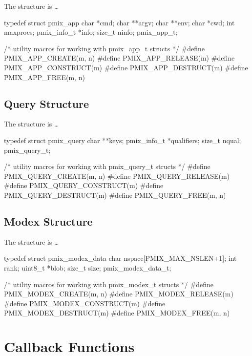 The  structure is \ldots

\cspecificstart
\begin{codepar}
typedef struct pmix_app {
    char *cmd;
    char **argv;
    char **env;
    char *cwd;
    int maxprocs;
    pmix_info_t *info;
    size_t ninfo;
} pmix_app_t;

/* utility macros for working with pmix_app_t structs */
#define PMIX_APP_CREATE(m, n)
#define PMIX_APP_RELEASE(m)
#define PMIX_APP_CONSTRUCT(m)
#define PMIX_APP_DESTRUCT(m)
#define PMIX_APP_FREE(m, n)
\end{codepar}
\cspecificend


\subsection{Query Structure}

The  structure is \ldots

\cspecificstart
\begin{codepar}
typedef struct pmix_query {
    char **keys;
    pmix_info_t *qualifiers;
    size_t nqual;
} pmix_query_t;

/* utility macros for working with pmix_query_t structs */
#define PMIX_QUERY_CREATE(m, n)
#define PMIX_QUERY_RELEASE(m)
#define PMIX_QUERY_CONSTRUCT(m)
#define PMIX_QUERY_DESTRUCT(m)
#define PMIX_QUERY_FREE(m, n)
\end{codepar}
\cspecificend


\subsection{Modex Structure}

The  structure is \ldots

\cspecificstart
\begin{codepar}
typedef struct pmix_modex_data {
    char nspace[PMIX_MAX_NSLEN+1];
    int rank;
    uint8_t *blob;
    size_t size;
} pmix_modex_data_t;

/* utility macros for working with pmix_modex_t structs */
#define PMIX_MODEX_CREATE(m, n)
#define PMIX_MODEX_RELEASE(m)
#define PMIX_MODEX_CONSTRUCT(m)
#define PMIX_MODEX_DESTRUCT(m)
#define PMIX_MODEX_FREE(m, n)
\end{codepar}
\cspecificend


\section{Callback Functions}

